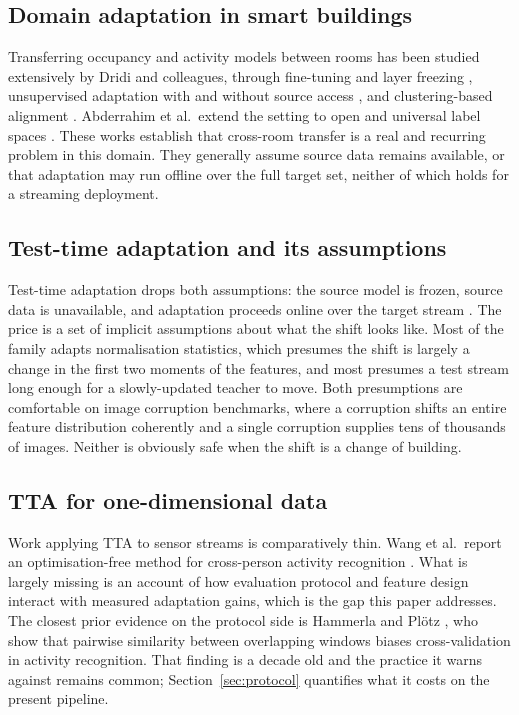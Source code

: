 \documentclass[a4paper,fleqn]{cas-dc}
\begin{document}
\subsection{Domain adaptation in smart buildings}

Transferring occupancy and activity models between rooms has been studied extensively by
Dridi and colleagues, through fine-tuning and layer freezing \cite{dridi2022}, unsupervised
adaptation with and without source access \cite{dridi_sfda}, and clustering-based
alignment \cite{dridi_cluster}. Abderrahim et al.\ extend the setting to open and universal
label spaces \cite{abderrahim2025,abderrahim2026}. These works establish that cross-room
transfer is a real and recurring problem in this domain. They generally assume source data
remains available, or that adaptation may run offline over the full target set, neither of
which holds for a streaming deployment.

\subsection{Test-time adaptation and its assumptions}

Test-time adaptation drops both assumptions: the source model is frozen, source data is
unavailable, and adaptation proceeds online over the target stream
\cite{liang2024,tent,cotta,shot}. The price is a set of implicit assumptions about what the
shift looks like. Most of the family adapts normalisation statistics, which presumes the
shift is largely a change in the first two moments of the features, and most presumes a
test stream long enough for a slowly-updated teacher to move. Both presumptions are
comfortable on image corruption benchmarks, where a corruption shifts an entire feature
distribution coherently and a single corruption supplies tens of thousands of images.
Neither is obviously safe when the shift is a change of building.

\subsection{TTA for one-dimensional data}

Work applying TTA to sensor streams is comparatively thin. Wang et al.\ report an
optimisation-free method for cross-person activity recognition \cite{wang2023}. What is
largely missing is an account of how evaluation protocol and feature design interact with
measured adaptation gains, which is the gap this paper addresses. The closest prior
evidence on the protocol side is Hammerla and Pl\"otz \cite{hammerla2015}, who show that
pairwise similarity between overlapping windows biases cross-validation in activity
recognition. That finding is a decade old and the practice it warns against remains
common; Section~\ref{sec:protocol} quantifies what it costs on the present pipeline.
\end{document}
